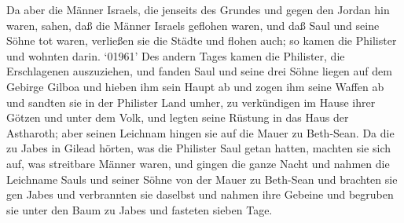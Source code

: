  Da aber die Männer Israels, die jenseits des Grundes und
gegen den Jordan hin waren, sahen, daß die Männer Israels geflohen
waren, und daß Saul und seine Söhne tot waren, verließen sie die Städte
und flohen auch; so kamen die Philister und wohnten darin. 
`01961' Des andern Tages kamen die Philister, die Erschlagenen
auszuziehen, und fanden Saul und seine drei Söhne liegen auf dem Gebirge
Gilboa  und hieben ihm sein Haupt ab und zogen ihm seine
Waffen ab und sandten sie in der Philister Land umher, zu verkündigen im
Hause ihrer Götzen und unter dem Volk,  und legten seine
Rüstung in das Haus der Astharoth; aber seinen Leichnam hingen sie auf
die Mauer zu Beth-Sean.  Da die zu Jabes in Gilead hörten,
was die Philister Saul getan hatten,  machten sie sich auf,
was streitbare Männer waren, und gingen die ganze Nacht und nahmen die
Leichname Sauls und seiner Söhne von der Mauer zu Beth-Sean und brachten
sie gen Jabes und verbrannten sie daselbst  und nahmen ihre
Gebeine und begruben sie unter den Baum zu Jabes und fasteten sieben
Tage.
